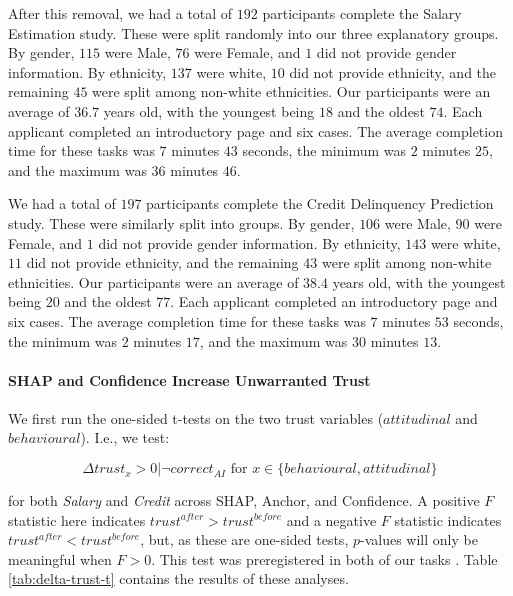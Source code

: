 After this removal, we had a total of $192$ participants complete the Salary Estimation study. These were split randomly into our three explanatory groups. By gender, $115$ were Male, $76$ were Female, and $1$ did not provide gender information. By ethnicity, $137$ were white, $10$ did not provide ethnicity, and the remaining $45$ were split among non-white ethnicities. Our participants were an average of $36.7$ years old, with the youngest being $18$ and the oldest $74$. Each applicant completed an introductory page and six cases. The average completion time for these tasks was $7$ minutes $43$ seconds, the minimum was $2$ minutes $25$, and the maximum was $36$ minutes $46$.

We had a total of $197$ participants complete the Credit Delinquency Prediction study. These were similarly split into groups. By gender, $106$ were Male, $90$ were Female, and $1$ did not provide gender information. By ethnicity, $143$ were white, $11$ did not provide ethnicity, and the remaining $43$ were split among non-white ethnicities. Our participants were an average of $38.4$ years old, with the youngest being $20$ and the oldest $77$. Each applicant completed an introductory page and six cases. The average completion time for these tasks was $7$ minutes $53$ seconds, the minimum was $2$ minutes $17$, and the maximum was $30$ minutes $13$.

\paragraph{SHAP and Confidence Increase Unwarranted Trust}
We first run the one-sided t-tests on the two trust variables ($attitudinal$ and $behavioural$). I.e., we test:

\begin{equation}
    \Delta trust_{x} > 0 | \neg correct_{AI} \text{ for } x \in \{behavioural, attitudinal\}
\end{equation}

\noindent for both \emph{Salary} and \emph{Credit} across SHAP, Anchor, and Confidence. A positive $F$ statistic here indicates $trust^{after} > trust^{before}$ and a negative $F$ statistic indicates $trust^{after} < trust^{before}$, but, as these are one-sided tests, $p$-values will only be meaningful when $F > 0$. This test was preregistered in both of our tasks \cite{natarajan_binns_2022}. Table \ref{tab:delta-trust-t} contains the results of these analyses.  

